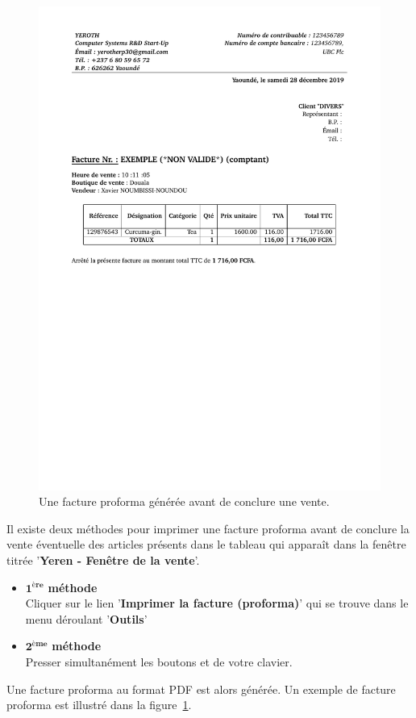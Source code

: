 \begin{figure}[!htbp]
	\centering
	\includegraphics[scale=0.75]{images/yeren-exemple-facture-grand-2017-06-13.pdf}
	\caption{Une facture proforma g\'en\'er\'ee avant de conclure une vente.}
	\label{fig:yeren-vendre-facture-proforma}
\end{figure}

Il existe deux m\'ethodes pour imprimer une facture
proforma avant de conclure la vente \'eventuelle des articles
pr\'esents dans le tableau qui appara\^it dans la fen\^etre
titr\'ee '\textbf{Yeren - Fen\^etre de la vente}'.

\begin{itemize}[]
	\item \textcolor{purplish}{$\mathbf{1^{\text{\`ere}}}$ \textbf{m\'ethode}}\\
		Cliquer sur le lien '\textbf{Imprimer la facture (proforma)}'
		qui se trouve dans le menu d\'eroulant '\textbf{Outils}'\\

	\item \textcolor{purplish}{$\mathbf{2^{\text{\`eme}}}$ \textbf{m\'ethode}}\\
		Presser simultan\'ement les boutons 
		et  de votre clavier.
\end{itemize}

Une facture proforma au format PDF est alors g\'en\'er\'ee. Un
exemple de facture proforma est illustr\'e dans la
figure~\ref{fig:yeren-vendre-facture-proforma}.

